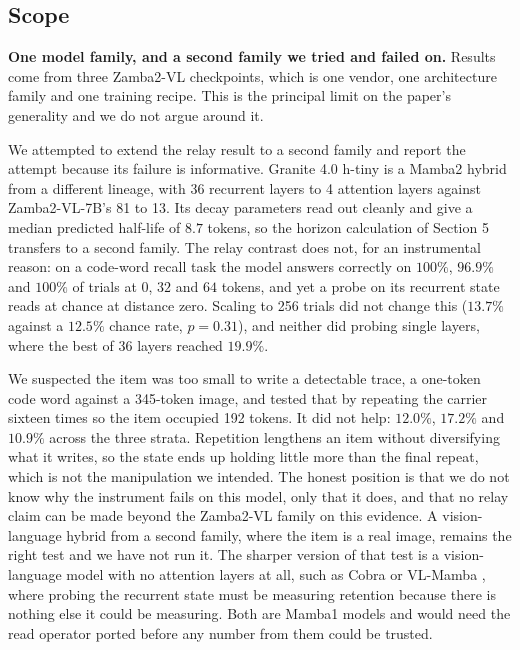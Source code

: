 \documentclass[11pt]{article}
\begin{document}
\subsection{Scope}

\textbf{One model family, and a second family we tried and failed on.} Results
come from three Zamba2-VL checkpoints, which is one vendor, one architecture
family and one training recipe. This is the principal limit on the paper's
generality and we do not argue around it.

We attempted to extend the relay result to a second family and report the
attempt because its failure is informative. Granite 4.0 h-tiny \cite{granite4} is a Mamba2
hybrid from a different lineage, with 36 recurrent layers to 4 attention layers
against Zamba2-VL-7B's 81 to 13. Its decay parameters read out cleanly and give
a median predicted half-life of $8.7$ tokens, so the horizon calculation of
Section 5 transfers to a second family. The relay contrast does not, for an
instrumental reason: on a code-word recall task the model answers correctly on
$100\%$, $96.9\%$ and $100\%$ of trials at $0$, $32$ and $64$ tokens, and yet a
probe on its recurrent state reads at chance at distance zero. Scaling to 256
trials did not change this ($13.7\%$ against a $12.5\%$ chance rate,
$p = 0.31$), and neither did probing single layers, where the best of 36 layers
reached $19.9\%$.

We suspected the item was too small to write a detectable trace, a one-token
code word against a 345-token image, and tested that by repeating the carrier
sixteen times so the item occupied 192 tokens. It did not help: $12.0\%$,
$17.2\%$ and $10.9\%$ across the three strata. Repetition lengthens an item
without diversifying what it writes, so the state ends up holding little more
than the final repeat, which is not the manipulation we intended. The honest
position is that we do not know why the instrument fails on this model, only
that it does, and that no relay claim can be made beyond the Zamba2-VL family
on this evidence. A vision-language hybrid from a second family, where the item
is a real image, remains the right test and we have not run it. The sharper
version of that test is a vision-language model with no attention layers at all,
such as Cobra \cite{zhao2025cobra} or VL-Mamba \cite{qiao2024vlmamba}, where
probing the recurrent state must be measuring retention because there is nothing
else it could be measuring. Both are Mamba1 models and would need the read
operator ported before any number from them could be trusted.
\end{document}
